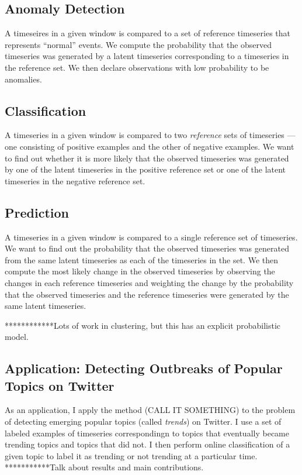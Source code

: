 \subsection{Anomaly Detection}
A timeseires in a given window is compared to a set of reference timeseries that
represents ``normal'' events. We compute the probability that the observed
timeseries was generated by a latent timeseries corresponding to a timeseries in
the reference set. We then declare observations with low probability to be
anomalies.

\subsection{Classification}
A timeseries in a given window is compared to two {\em reference} sets of
timeseries --- one consisting of positive examples and the other of negative
examples. We want to find out whether it is more likely that the observed
timeseries was generated by one of the latent timeseries in the positive
reference set or one of the latent timeseries in the negative reference set.

\subsection{Prediction}
A timeseries in a given window is compared to a single reference set of
timeseries. We want to find out the probability that the observed timeseries was
generated from the same latent timeseries as each of the timeseries in the
set. We then compute the most likely change in the observed timeseries by
observing the changes in each reference timeseries and weighting the change by
the probability that the observed timeseries and the reference timeseries were
generated by the same latent timeseries.
 
************Lots of work in clustering, but this has an explicit probabilistic
model.

\subsection{Application: Detecting Outbreaks of Popular Topics on Twitter}
As an application, I apply the method (CALL IT SOMETHING) to the problem of
detecting emerging popular topics (called {\em trends}) on Twitter. I use a set
of labeled examples of timeseries correspondingn to topics that eventually
became trending topics and topics that did not. I then perform online
classification of a given topic to label it as trending or not trending at a
particular time.  ***********Talk about results and main contributions.
